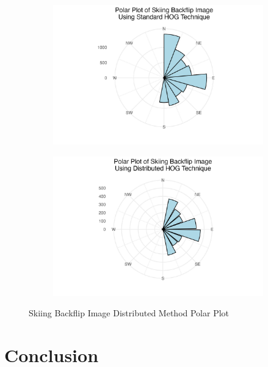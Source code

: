 \documentclass[
  letterpaper,
  DIV=11,
  numbers=noendperiod]{scrreprt}
\begin{document}
\begin{figure}

\begin{minipage}{0.50\linewidth}

\begin{figure}[H]

{\centering \includegraphics{images/plots/backflip/backflip_standard_polar_plot.jpg}

}


\end{figure}%

\end{minipage}%
%
\begin{minipage}{0.50\linewidth}

\begin{figure}[H]

{\centering \includegraphics{images/plots/backflip/backflip_contribution_polar_plot.jpg}

}


\end{figure}%

\end{minipage}%

\caption{\label{fig-flip-distributed-and-standard-polar}Skiing Backflip
Image Distributed Method Polar Plot}

\end{figure}%


\chapter{Conclusion}\label{conclusion}
\end{document}
